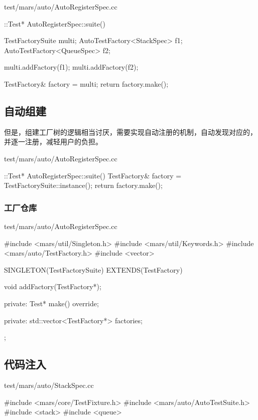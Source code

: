 \begin{content}
\begin{nodiff}{test/mars/auto/AutoRegisterSpec.cc}
 \begin{c++}
::Test* AutoRegisterSpec::suite() {
  TestFactorySuite multi;
  AutoTestFactory<StackSpec> f1;
  AutoTestFactory<QueueSpec> f2;

  multi.addFactory(f1);
  multi.addFactory(f2);

  TestFactory& factory = multi;
  return factory.make();
}
 \end{c++}
\end{nodiff}

\subsection{自动组建}

但是，组建工厂树的逻辑相当讨厌，需要实现自动注册的机制，自动发现对应的，并逐一注册，减轻用户的负担。

\begin{nodiff}{test/mars/auto/AutoRegisterSpec.cc}
 \begin{c++}
::Test* AutoRegisterSpec::suite() {
  TestFactory& factory = TestFactorySuite::instance();
  return factory.make();
}
 \end{c++}
\end{nodiff}

\subsubsection{工厂仓库}

\begin{nodiff}{test/mars/auto/AutoRegisterSpec.cc}
 \begin{c++}
#include <mars/util/Singleton.h>
#include <mars/util/Keywords.h>
#include <mars/auto/TestFactory.h>
#include <vector>

SINGLETON(TestFactorySuite) EXTENDS(TestFactory) {
  void addFactory(TestFactory*);

private:
  Test* make() override;

private:
  std::vector<TestFactory*> factories;
};
 \end{c++}
\end{nodiff}

\subsection{代码注入}

\begin{nodiff}{test/mars/auto/StackSpec.cc}
 \begin{c++}
#include <mars/core/TestFixture.h>
#include <mars/auto/AutoTestSuite.h>
#include <stack>
#include <queue>


\end{c++}
\end{nodiff}
\end{content}
